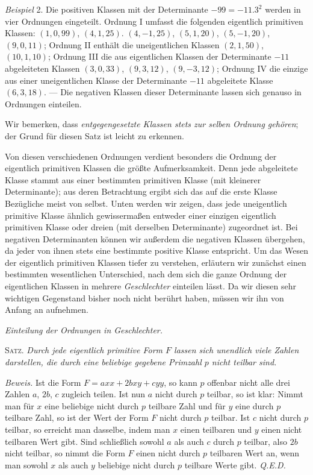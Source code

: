 \textit{Beispiel} 2. Die positiven Klassen mit der Determinante $-99=-11.3^2$ werden in vier Ordnungen eingeteilt. Ordnung I umfasst die folgenden eigentlich primitiven Klassen: $(1,0,99)$, $(4,1,25)$. $(4,-1,25)$, $(5,1,20)$, $(5,-1,20)$, $(9,0,11)$; Ordnung II enthält die uneigentlichen Klassen $(2,1,50)$, $(10,1,10)$; Ordnung III die aus eigentlichen Klassen der Determinante $-11$ abgeleiteten Klassen $(3,0,33)$, $(9,3,12)$, $(9,-3,12)$; Ordnung IV die einzige aus einer uneigentlichen Klasse der Determinante $-11$ abgeleitete Klasse $(6,3,18)$. --- Die negativen Klassen dieser Determinante lassen sich genauso in Ordnungen einteilen.

Wir bemerken, dass \textit{entgegengesetzte Klassen stets zur selben Ordnung gehören}; der Grund für diesen Satz ist leicht zu erkennen.

Von diesen verschiedenen Ordnungen verdient besonders die Ordnung der eigentlich primitiven Klassen die größte Aufmerksamkeit. Denn jede abgeleitete Klasse stammt aus einer bestimmten primitiven Klasse (mit kleinerer Determinante); aus deren Betrachtung ergibt sich das auf die erste Klasse Bezügliche meist von selbst. Unten werden wir zeigen, dass jede uneigentlich primitive Klasse ähnlich gewissermaßen entweder einer einzigen eigentlich primitiven Klasse oder dreien (mit derselben Determinante) zugeordnet ist. Bei negativen Determinanten können wir außerdem die negativen Klassen übergehen, da jeder von ihnen stets eine bestimmte positive Klasse entspricht. Um das Wesen der eigentlich primitiven Klassen tiefer zu verstehen, erläutern wir zunächst einen bestimmten wesentlichen Unterschied, nach dem sich die ganze Ordnung der eigentlichen Klassen in mehrere \textit{Geschlechter} einteilen lässt. Da wir diesen sehr wichtigen Gegenstand bisher noch nicht berührt haben, müssen wir ihn von Anfang an aufnehmen.

\begin{center}
\textit{Einteilung der Ordnungen in Geschlechter.}
\end{center}

\textsc{Satz.} \textit{Durch jede eigentlich primitive Form $F$ lassen sich unendlich viele Zahlen darstellen, die durch eine beliebige gegebene Primzahl $p$ nicht teilbar sind.}

\textit{Beweis.} Ist die Form $F=axx+2bxy+cyy$, so kann $p$ offenbar nicht alle drei Zahlen $a$, $2b$, $c$ zugleich teilen. Ist nun $a$ nicht durch $p$ teilbar, so ist klar: Nimmt man für $x$ eine beliebige nicht durch $p$ teilbare Zahl und für $y$ eine durch $p$ teilbare Zahl, so ist der Wert der Form $F$ nicht durch $p$ teilbar. Ist $c$ nicht durch $p$ teilbar, so erreicht man dasselbe, indem man $x$ einen teilbaren und $y$ einen nicht teilbaren Wert gibt. Sind schließlich sowohl $a$ als auch $c$ durch $p$ teilbar, also $2b$ nicht teilbar, so nimmt die Form $F$ einen nicht durch $p$ teilbaren Wert an, wenn man sowohl $x$ als auch $y$ beliebige nicht durch $p$ teilbare Werte gibt. \textit{Q.E.D.}


